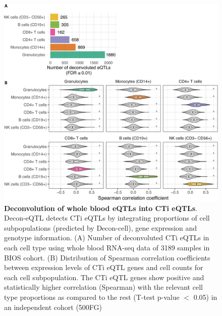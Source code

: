 \begin{figure}[H]
	\includegraphics[width=\textwidth]{chapters/chapter4-deconvolution/img/fig3.png}
	\caption{\textbf{Deconvolution of whole blood eQTLs into CTi eQTLs}. Decon-eQTL detects CTi eQTLs by integrating proportions of cell subpopulations (predicted by Decon-cell), gene expression and genotype information. (A) Number of deconvoluted CTi eQTLs in each cell type using whole blood RNA-seq data of 3189 samples in BIOS cohort. (B) Distribution of Spearman correlation coefficients between expression levels of CTi eQTL genes and cell counts for each cell subpopulation. The CTi eQTL genes show positive and statistically higher correlation (Spearman) with the relevant cell type proportions as compared to the rest (T-test p-value $<$ 0.05) in an independent cohort (500FG)}
\end{figure}


